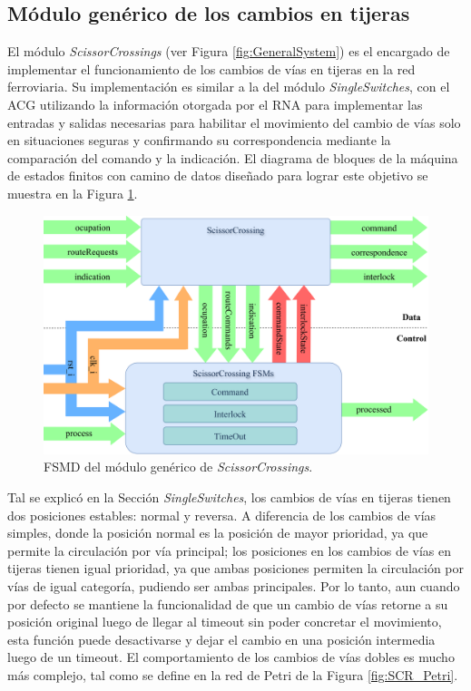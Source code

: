 \subsection{Módulo genérico de los cambios en tijeras}
	\label{sec:ACG_scr}
		
	El módulo \textit{ScissorCrossings} (ver Figura \ref{fig:GeneralSystem}) es el encargado de implementar el funcionamiento de los cambios de vías en tijeras en la red ferroviaria. Su implementación es similar a la del módulo \textit{SingleSwitches}, con el ACG utilizando la información otorgada por el RNA para implementar las entradas y salidas necesarias para habilitar el movimiento del cambio de vías solo en situaciones seguras y confirmando su correspondencia mediante la comparación del comando y la indicación. El diagrama de bloques de la máquina de estados finitos con camino de datos diseñado para lograr este objetivo se muestra en la Figura \ref{fig:SCR_module}.
	
	\begin{figure}[H]
		\centering
		\includegraphics[width=1\textwidth]{Figuras/SCR_module}
		\centering\caption{FSMD del módulo genérico de \textit{ScissorCrossings}.}
		\label{fig:SCR_module}
	\end{figure}
	
	Tal se explicó en la Sección \textit{SingleSwitches}, los cambios de vías en tijeras tienen dos posiciones estables: normal y reversa. A diferencia de los cambios de vías simples, donde la posición normal es la posición de mayor prioridad, ya que permite la circulación por vía principal; los posiciones en los cambios de vías en tijeras tienen igual prioridad, ya que ambas posiciones permiten la circulación por vías de igual categoría, pudiendo ser ambas principales. Por lo tanto, aun cuando por defecto se mantiene la funcionalidad de que un cambio de vías retorne a su posición original luego de llegar al timeout sin poder concretar el movimiento, esta función puede desactivarse y dejar el cambio en una posición intermedia luego de un timeout. El comportamiento de los cambios de vías dobles es mucho más complejo, tal como se define en la red de Petri de la Figura \ref{fig:SCR_Petri}.
	
